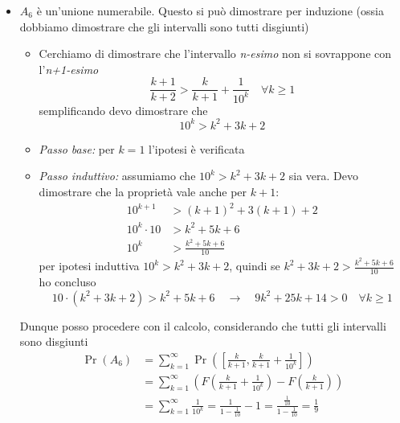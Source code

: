 \begin{itemize}
\[			      \]
			\item $A_6$ è un'unione numerabile. Questo si può dimostrare per induzione (ossia dobbiamo dimostrare che gli intervalli sono tutti disgiunti)
			      \begin{itemize}
				      \item Cerchiamo di dimostrare che l'intervallo \textit{n-esimo} non si sovrappone con l'\textit{n+1-esimo}
				            \[
					            \frac{k+1}{k+2} > \frac{k}{k+1}+ \frac{1}{10^k}  \quad \forall k \ge 1
				            \]
				            semplificando devo dimostrare che
				            \[
					            10^k > k^2  + 3k + 2
				            \]
				      \item \textit{Passo base:} per $ k=1 $ l'ipotesi è verificata
				      \item \textit{Passo induttivo:} assumiamo che $ 10^k > k^2  + 3k + 2 $ sia vera. Devo dimostrare che la proprietà vale anche per $ k+1 $:
				            \begin{align*}
					            10^{k+1}       & >\left(k+1\right)^{2} + 3\left(k+1\right) + 2 \\[0.7em]
					            10^{k}\cdot 10 & > k^2  + 5k + 6                               \\[0.7em]
					            10^{k}         & > \frac{k^2  + 5k + 6}{10}
				            \end{align*}
				            per ipotesi induttiva $ 10^{k} > k^2  + 3k + 2 $, quindi se $ k^2  + 3k + 2 > \frac{k^2  + 5k + 6}{10} $ ho concluso
				            \[
					            10\cdot \left(k^2  + 3k + 2\right) > k^2  + 5k + 6 \quad \rightarrow \quad 9 k^2  + 25k + 14 > 0 \quad \forall k \ge  1
				            \]
			      \end{itemize}
			      Dunque posso procedere con il calcolo, considerando che tutti gli intervalli sono disgiunti
			      \[
				      \begin{aligned}
					      \Pr\left(A_6\right) & =\sum_{k=1}^{\infty} \Pr\left(\left[\frac{k}{k+1}, \frac{k}{k+1}+\frac{1}{10^k}\right]\right)                  \\
					                          & =\sum_{k=1}^{\infty}\left(F\left(\frac{k}{k+1}+\frac{1}{10^k}\right)-F\left(\frac{k}{k+1}\right)\right)        \\
					                          & =\sum_{k=1}^{\infty} \frac{1}{10^k}=\frac{1}{1-\frac{1}{10}}-1=\frac{\frac{1}{10}}{1-\frac{1}{10}}=\frac{1}{9}
				      \end{aligned}
			      \]
		\end{itemize}
